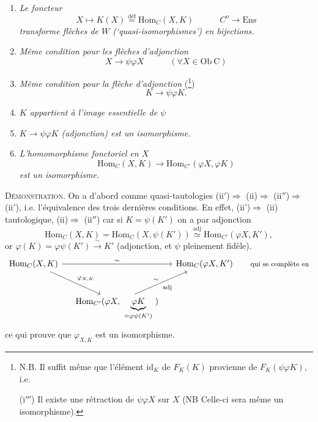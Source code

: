 \documentclass[11pt]{article}
\newcommand{\printedpage}[1]{\marginpar{\footnotesize p.~#1}}
\newcommand{\msp}[1]{\marginpar{\footnotesize [#1]}}
\newcommand{\dfeq}{\overset{\text{déf}}{=}}
\begin{document}
\printedpage{23}

\begin{enumerate}
\item[(i)] \textit{Le foncteur}
\[
X\longmapsto K(X)\dfeq\mathrm{Hom}_C(X,K) \qquad\quad C^{o}\longrightarrow\mathrm{Ens}
\]
\textit{transforme flèches de $W$ (‘quasi-isomorphismes’) en bijections.}
\item[(i$'$)] \textit{Même condition pour les flèches d'adjonction}
\[
X\longrightarrow\psi\varphi X \qquad\quad (\forall X\in\mathrm{Ob}\ \mathrm{C})
\]
\item[(i$''$)] \textit{Même condition pour la flèche d'adjonction} (\footnote[6]{N.B. Il suffit même que l'élément $\mathrm{id}_K$ de $F_K(K)$ provienne de $F_K(\psi\varphi K)$, i.e.\par (i$'''$) Il existe une rétraction de $\psi\varphi X$ sur $X$ (NB Celle-ci sera même un isomorphisme).})
\[
K\longrightarrow\psi\varphi K.
\]
\item[(ii)] \textit{$K$ appartient à l'image essentielle de $\psi$}
\item[(ii$'$)] \textit{$K\longrightarrow\psi\varphi K$ (adjonction) est un isomorphisme.}
\item[(ii$''$)] \textit{L'homomorphisme fonctoriel en $X$}
\[
\mathrm{Hom}_C(X,K)\longrightarrow\mathrm{Hom}_{C'}(\varphi X,\varphi K)
\]
\textit{est un isomorphisme.}
\end{enumerate}

\textsc{Démonstration.} On a d'abord comme quasi-tautologies (ii$'$)$\Longrightarrow$ (ii)$\Longrightarrow$ (ii$''$)$\Longrightarrow$ (ii$'$), i.e. l'équivalence des trois dernières conditions. En effet, (ii’)$\Longrightarrow$ (ii) tautologique, (ii)$\Longrightarrow$ (ii$''$) car si $K=\psi(K')$ on a %
\msp{page 38}
par adjonction
\[
\mathrm{Hom}_C(X,K)=\mathrm{Hom}_C(X,\psi(K'))\overset{\text{adj}}{\simeq}\mathrm{Hom}_{C'}(\varphi X,K'),
\]
or $\varphi(K)=\varphi\psi(K')\xrightarrow{\ \sim\ }K'$ (adjonction, et $\psi$ pleinement fidèle).
\[
\begin{tikzcd}[column sep=small, row sep=large]
\mathrm{Hom}_C(X,K) \arrow[rr, "\sim"] \arrow[dr, "\varphi_{X,K}"] & & \mathrm{Hom}_C(\varphi X,K') & \text{\footnotesize qui se complète en} \\ %
& \mathrm{Hom}_{C'}(\varphi X,\ \underbrace{\varphi K}_{=\varphi\psi(K')}\ ) \arrow[ur, "\sim", "\text{adj}"'] & &
\end{tikzcd}
\]
ce qui prouve que $\varphi_{X,K}$ est un isomorphisme.
\end{document}
